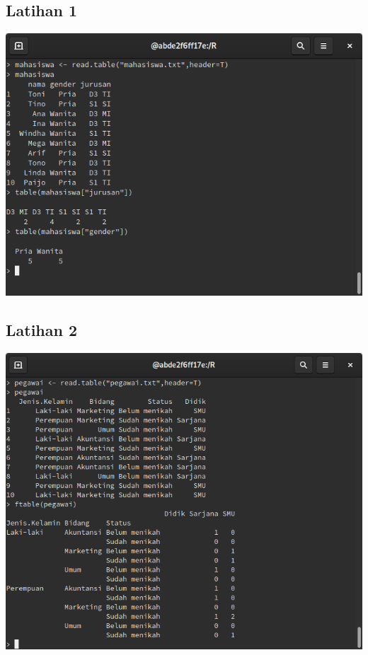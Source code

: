 \documentclass[a4paper,12pt]{article}
\begin{document}
\subsection{Latihan 1}
\includegraphics[width=\linewidth]{5}
\subsection{Latihan 2}
\includegraphics[width=\linewidth]{6}
\end{document}
